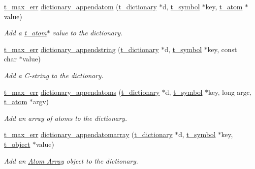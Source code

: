 \begin{DoxyCompactItemize}
\hyperlink{group__datatypes_ga73edaae82b318855cc09fac994918165}{t\_\-max\_\-err} \hyperlink{group__dictionary_ga22f5a417a6290c508d29196c3c6d6d58}{dictionary\_\-appendatom} (\hyperlink{structt__dictionary}{t\_\-dictionary} $\ast$d, \hyperlink{structt__symbol}{t\_\-symbol} $\ast$key, \hyperlink{structt__atom}{t\_\-atom} $\ast$value)
\begin{DoxyCompactList}\small\item\em Add a \hyperlink{structt__atom}{t\_\-atom}$\ast$ value to the dictionary. \item\end{DoxyCompactList}\item 
\hyperlink{group__datatypes_ga73edaae82b318855cc09fac994918165}{t\_\-max\_\-err} \hyperlink{group__dictionary_ga9b5b07cf479be0446d6a4441c3bdf83a}{dictionary\_\-appendstring} (\hyperlink{structt__dictionary}{t\_\-dictionary} $\ast$d, \hyperlink{structt__symbol}{t\_\-symbol} $\ast$key, const char $\ast$value)
\begin{DoxyCompactList}\small\item\em Add a C-\/string to the dictionary. \item\end{DoxyCompactList}\item 
\hyperlink{group__datatypes_ga73edaae82b318855cc09fac994918165}{t\_\-max\_\-err} \hyperlink{group__dictionary_ga863a83cc13afbd42a09e8505bee8eea5}{dictionary\_\-appendatoms} (\hyperlink{structt__dictionary}{t\_\-dictionary} $\ast$d, \hyperlink{structt__symbol}{t\_\-symbol} $\ast$key, long argc, \hyperlink{structt__atom}{t\_\-atom} $\ast$argv)
\begin{DoxyCompactList}\small\item\em Add an array of atoms to the dictionary. \item\end{DoxyCompactList}\item 
\hyperlink{group__datatypes_ga73edaae82b318855cc09fac994918165}{t\_\-max\_\-err} \hyperlink{group__dictionary_gac1f0f17da56b71ef6f21c972535ee609}{dictionary\_\-appendatomarray} (\hyperlink{structt__dictionary}{t\_\-dictionary} $\ast$d, \hyperlink{structt__symbol}{t\_\-symbol} $\ast$key, \hyperlink{structt__object}{t\_\-object} $\ast$value)
\begin{DoxyCompactList}\small\item\em Add an \hyperlink{group__atomarray}{Atom Array} object to the dictionary. \item\end{DoxyCompactList}\item 

\end{DoxyCompactItemize}

